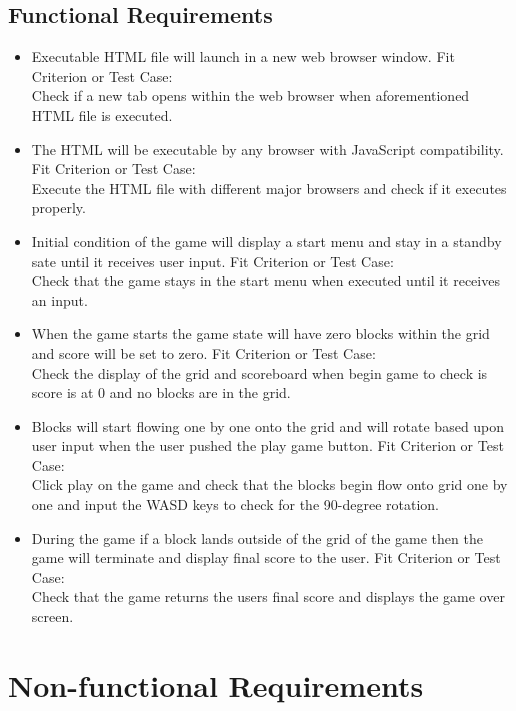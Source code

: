 \documentclass[12pt, titlepage]{article}
\begin{document}
\subsection{Functional Requirements}
\begin{itemize}
    \item
    Executable HTML file will launch in a new web browser window.    \subitem
    Fit Criterion or Test Case: \\
    Check if a new tab opens within the web browser when aforementioned HTML file is executed.    
    \item
    The HTML will be executable by any browser with JavaScript compatibility.    \subitem
    Fit Criterion or Test Case: \\
    Execute the HTML file with different major browsers and check if it executes properly.    
    \item
    Initial condition of the game will display a start menu and stay in a standby sate until it receives user input.    \subitem
    Fit Criterion or Test Case: \\
    Check that the game stays in the start menu when executed until it receives an input.    
    \item
    When the game starts the game state will have zero blocks within the grid and score will be set to zero.    \subitem
    Fit Criterion or Test Case: \\
    Check the display of the grid and scoreboard when begin game to check is score is at 0 and no blocks are in the grid.    
    \item
    Blocks will start flowing one by one onto the grid and will rotate based upon user input when the user pushed the play game button.    \subitem
    Fit Criterion or Test Case: \\
    Click play on the game and check that the blocks begin flow onto grid one by one and input the WASD keys to check for the 90-degree rotation.    
    \item
    During the game if a block lands outside of the grid of the game then the game will terminate and display final score to the user.    \subitem
    Fit Criterion or Test Case: \\
    Check that the game returns the users final score and displays the game over screen.    
    \end{itemize}
    



\section{Non-functional Requirements}
\end{document}

